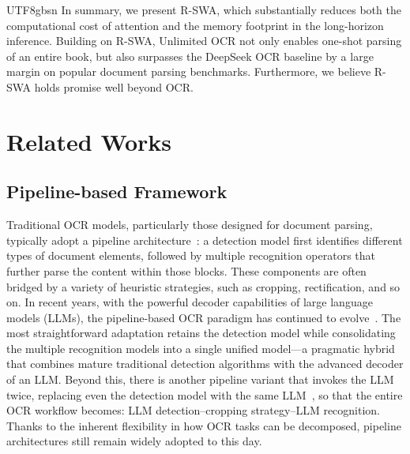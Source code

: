 \documentclass[11pt, a4paper, logo, copyright, nonumbering]{deepseek}
\begin{document}
\begin{CJK*}{UTF8}{gbsn}
In summary, we present R-SWA, which substantially reduces both the computational cost of attention and the memory footprint in the long-horizon inference. Building on R-SWA, Unlimited OCR not only enables one-shot parsing of an entire book, but also surpasses the DeepSeek OCR baseline by a large margin on popular document parsing benchmarks. Furthermore, we believe R-SWA holds promise well beyond OCR.






\section{Related Works}
\label{sec:related1}


\subsection{Pipeline-based Framework}
Traditional OCR models, particularly those designed for document parsing, typically adopt a pipeline architecture~\cite{cui2025paddleocr,cui2025paddleocrvl,wang2024mineru,li2025monkeyocr,feng2025dolphin}: a detection model first identifies different types of document elements, followed by multiple recognition operators that further parse the content within those blocks. These components are often bridged by a variety of heuristic strategies, such as cropping, rectification, and so on. In recent years, with the powerful decoder capabilities of large language models (LLMs), the pipeline-based OCR paradigm has continued to evolve~\cite{li2025monkeyocr}. The most straightforward adaptation retains the detection model while consolidating the multiple recognition models into a single unified model---a pragmatic hybrid that combines mature traditional detection algorithms with the advanced decoder of an LLM. Beyond this, there is another pipeline variant that invokes the LLM twice, replacing even the detection model with the same LLM~\cite{feng2025dolphin}, so that the entire OCR workflow becomes: LLM detection--cropping strategy--LLM recognition. Thanks to the inherent flexibility in how OCR tasks can be decomposed, pipeline architectures still remain widely adopted to this day.


\end{CJK*}
\end{document}
